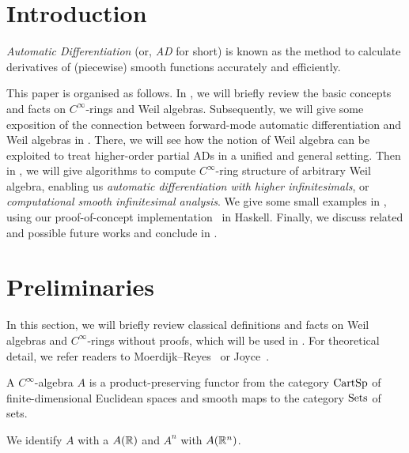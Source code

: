 \documentclass[%
  sigconf,authorversion,screen]{acmart}
\begin{document}

\maketitle

\section{Introduction}\label{sec:intro}
\sloppy
\emph{Automatic Differentiation} (or, \emph{AD} for short) is known as the method to calculate derivatives of (piecewise) smooth functions accurately and efficiently.

This paper is organised as follows.
In , we will briefly review the basic concepts and facts on $C^\infty$-rings and Weil algebras.
Subsequently, we will give some exposition of the connection between forward-mode automatic differentiation and Weil algebras in .
There, we will see how the notion of Weil algebra can be exploited to treat higher-order partial ADs in a unified and general setting.
Then in , we will give algorithms to compute $C^\infty$-ring structure of arbitrary Weil algebra, enabling us \emph{automatic differentiation with higher infinitesimals}, or \emph{computational smooth infinitesimal analysis}.
We give some small examples in , using our proof-of-concept implementation~\cite{Ishii:2020aa} in Haskell.
Finally, we discuss related and possible future works and conclude in .

\section{Preliminaries}\label{sec:prel}
In this section, we will briefly review classical definitions and facts on Weil algebras and $C^\infty$-rings without proofs, which will be used in .
For theoretical detail, we refer readers to Moerdijk--Reyes~\cite[Chapters I and II]{Moerdijk:1991aa} or Joyce~\cite{joyce2016algebraic}.

\begin{definition}
  A \emph{$C^\infty$}-algebra $A$ is a product-preserving functor from the category $\mathord{\mathrm{CartSp}}$ of finite-dimensional Euclidean spaces and smooth maps to the category $\mathord{\mathrm{Sets}}$ of sets.

  We identify $A$ with a $A(\mathbb{R})$ and $A^n$ with $A(\mathbb{R}^n)$.
\end{definition}
\end{document}
